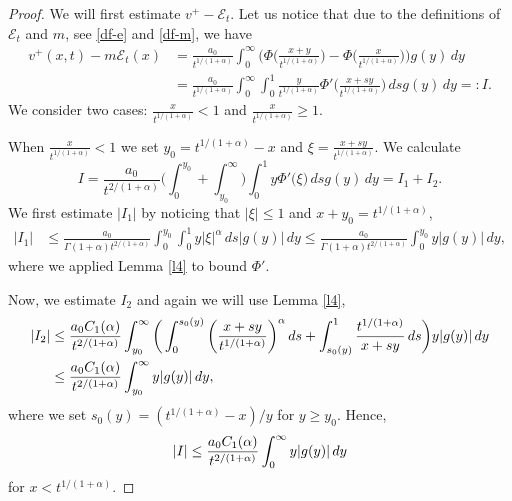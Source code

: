 \documentclass[10pt,a4paper]{amsart}
\def\sE{{\mathscr{E}}}
\begin{document}
\begin{proof} We will first estimate $v^+ - \sE_t$.
Let us notice that due to the definitions of $\sE_t$ and $m$, see \eqref{df-e} and \eqref{df-m}, we have
\begin{align*}
v^+(x,t) - m\sE_t(x) &= \frac{a_0}{t^{1/(1+\alpha)}}
\int_0^\infty
\bigg( \Phi \bigg(\frac{x+y}{t^{1/(1+\alpha)}}\bigg)
-  \Phi \bigg(\frac{x}{t^{1/(1+\alpha)}}\bigg)\bigg)g(y)\, dy\\
&= \frac{a_0}{t^{1/(1+\alpha)}}
\int_0^\infty \int_0^1 \frac{y}{t^{1/(1+\alpha)}}
\Phi'\bigg(\frac{x+sy}{t^{1/(1+\alpha)}}\bigg)\, ds g(y)\, dy =:I
.
\end{align*}
We consider two cases: $\frac{x}{t^{1/(1+\alpha)}}< 1$ and  $\frac{x}{t^{1/(1+\alpha)}} \ge 1$. 

When $\frac{x}{t^{1/(1+\alpha)}}< 1$ we set $y_0 = t^{1/(1+\alpha)}- x$ and $\xi=\frac{x+sy}{t^{1/(1+\alpha)}}$. We calculate
$$
I = \frac{a_0}{t^{2/(1+\alpha)}} \bigg(\int_0^{y_0} + \int_{y_0}^\infty\bigg)\int_0^1 y \Phi'\big(\xi%
\big)\, ds g(y)\, dy = I_1 + I_2.
$$
We first estimate $|I_1|$ by noticing that $|\xi|\le1$ and $x+y_0= t^{1/(1+\alpha)}$,
\begin{align*}
 |I_1| &\le \frac{a_0}{\Gamma(1+\alpha)t^{2/(1+\alpha)}} \int_0^{y_0} \int_0^1y| \xi|^\alpha
\, ds |g(y)|\, dy
\le \frac{a_0}{\Gamma(1+\alpha)t^{2/(1+\alpha)}} 
\int_0^{y_0} y| g(y)| \, dy,   
\end{align*}
where we applied  Lemma \ref{l4} to bound $\Phi'.$

Now, we estimate $I_2$  and again we will use Lemma \ref{l4},
\begin{align*}
 |I_2 |&\le 
 \frac{a_0 C_1(\alpha)}%
 {t^{2/(1+\alpha)}} \int_{y_0}^\infty \bigg(
 \int_0^{s_0(y)} \bigg(\frac{x+sy}{t^{1/(1+\alpha)}}\bigg)^\alpha \, ds + \int_{s_0(y)}^1 
 \frac {t^{1/(1+\alpha)}}{x+sy}\,ds \bigg)y|g(y)|\, dy\\ &
 \le \frac{a_0 C_1(\alpha)}{%
 t^{2/(1+\alpha)}} \int_{y_0}^\infty y |g(y)|\, dy,
\end{align*}
where we set $s_0(y) = (t^{1/(1+\alpha)}-x)/y$ for $y\ge y_0$. %
Hence,
$$
|I| \le \frac{a_0 C_1(\alpha)}{%
t^{2/(1+\alpha)}} \int_{0}^\infty y |g(y)|\, dy
$$
for $x< t^{1/(1+\alpha)}$.


\end{proof}
\end{document}
